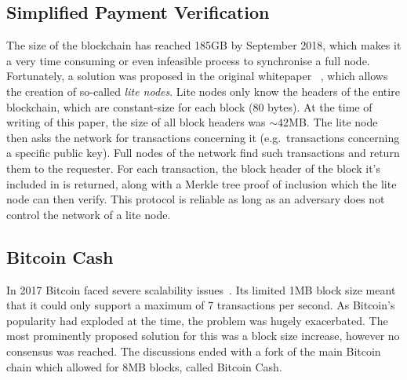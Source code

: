 \subsection{Simplified Payment Verification}
The size of the blockchain has reached 185GB by September 2018, which makes
it a very time consuming or even infeasible process to synchronise a full
node. Fortunately, a solution was proposed in the original whitepaper
~\cite{bitcoin}, which allows the creation of so-called \textit{lite nodes}.
Lite nodes only know the headers of the entire blockchain, which are
constant-size for each block (80 bytes). At the time of writing of this
paper, the size of all block headers was $\sim$42MB. The lite node then asks the
network for transactions concerning it (e.g.\ transactions concerning a
specific public key). Full nodes of the network find such transactions and
return them to the requester. For each transaction, the block header of the
block it's included in is returned, along with a Merkle tree proof of
inclusion which the lite node can then verify. This protocol is reliable as
long as an adversary does not control the network of a lite node.

\subsection{Bitcoin Cash}
In 2017 Bitcoin faced severe scalability issues~\cite{onscaling}. Its limited
1MB block size meant that it could only support a maximum of 7 transactions per
second. As Bitcoin's popularity had exploded at the time, the problem was
hugely exacerbated. The most prominently proposed solution for this was a block
size increase, however no consensus was reached. The discussions ended with a
fork of the main Bitcoin chain which allowed for 8MB blocks, called Bitcoin
Cash.
